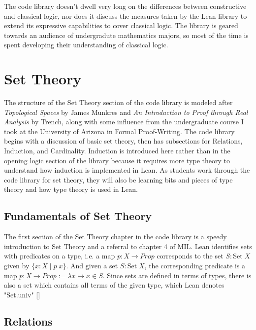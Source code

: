 The code library doesn't dwell very long on the differences between 
constructive and classical logic, nor does it discuss the measures
taken by the Lean library to extend its expressive capabilities to 
cover classical logic. The library is geared towards an audience of 
undergradute mathematics majors, so most of the time is spent developing
their understanding of classical logic.


\section{Set Theory}

The structure of the Set Theory section of the code library is modeled after 
\textit{Topological Spaces} by James Munkres and 
\textit{An Introduction to Proof through Real Analysis} by Trench, along with
some influence from the undergraduate course I took at the University of Arizona
in Formal Proof-Writing. The code library begins with a discussion of basic
set theory, then has subsections for Relations, Induction, and Cardinality. 
Induction is introduced here rather than in the opening logic section of the 
library because it requires more type theory to understand how induction is
implemented in Lean. As students work through the code library for set theory,
they will also be learning bits and pieces of type theory and how type theory
is used in Lean. 

\subsection{Fundamentals of Set Theory}

The first section of the Set Theory chapter in the code library is 
a speedy introduction to Set Theory and a referral to chapter 4 of
MIL. Lean identifies sets with predicates on a type, i.e. a map
$p:X\to Prop$ corresponds to the set $S:\mathrm{Set}\;X$ given by
$\{x:X\;|\;p\;x\}$. And given a set $S:\mathrm{Set}\;X$, the corresponding
predicate is a map $p:X\to Prop:=\lambda x\mapsto x\in S$. Since sets are
defined in terms of types, there is also a set which contains all terms 
of the given type, which Lean denotes "Set.univ"
[]

\subsection{Relations}


